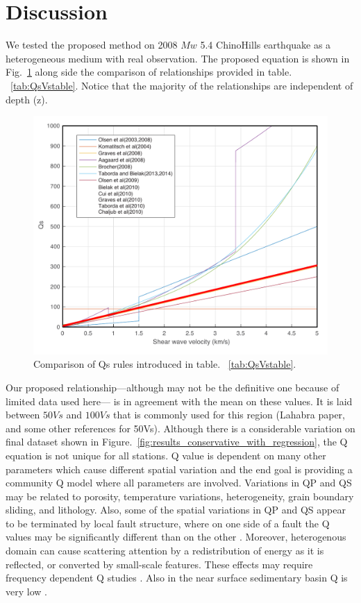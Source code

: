 \section{Discussion}

We tested the proposed method on 2008 $Mw$ 5.4 ChinoHills earthquake as a heterogeneous medium with real observation.  The proposed equation is shown in Fig.~\ref{fig:Figure_q_models}  along side the comparison of relationships provided in table. ~\ref{tab:QsVstable}. Notice that the majority of the relationships are independent of depth (z). 

 \begin{figure}
    \centering
    \includegraphics[width=400 px]{figures/pdf/Figure_q_models.pdf}
    \caption{Comparison of Qs rules introduced in table. ~\ref{tab:QsVstable}.}
    \label{fig:Figure_q_models}
\end{figure}

Our proposed relationship---although may not be the definitive one because of limited data used here--- is in agreement with the mean on these values. It is laid between $50Vs$ and $100Vs$ that is commonly used for this region (Lahabra paper, and some other references for 50Vs). Although there is a considerable variation on final dataset shown in Figure.~\ref{fig:results_conservative_with_regression}, the Q equation is not unique for all stations.  Q value is dependent on many other parameters which cause different spatial variation and the end goal is providing a community Q model where all parameters are involved. Variations in QP and QS may be related to porosity, temperature variations, heterogeneity, grain boundary sliding, and lithology. Also, some of the spatial variations in QP and QS appear to be terminated by local fault structure, where on one side of a fault the Q values may be significantly different than on the other \citep{hauksson2006attenuation}.  Moreover, heterogenous domain can cause scattering attention by a redistribution of energy as it is reflected, or converted by small-scale features. These effects may require frequency dependent Q studies \citep{frankel1991mechanisms}.  Also in the near surface sedimentary basin Q is very low \citep{abercrombie1997near}.\\

